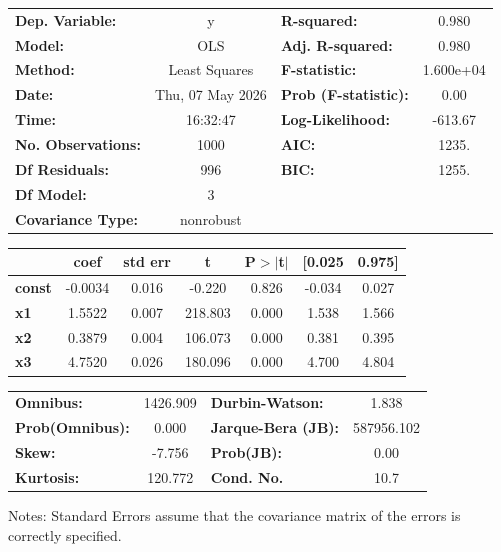 \begin{center}
\begin{tabular}{lclc}
\toprule
\textbf{Dep. Variable:}    &        y         & \textbf{  R-squared:         } &     0.980   \\
\textbf{Model:}            &       OLS        & \textbf{  Adj. R-squared:    } &     0.980   \\
\textbf{Method:}           &  Least Squares   & \textbf{  F-statistic:       } & 1.600e+04   \\
\textbf{Date:}             & Thu, 07 May 2026 & \textbf{  Prob (F-statistic):} &     0.00    \\
\textbf{Time:}             &     16:32:47     & \textbf{  Log-Likelihood:    } &   -613.67   \\
\textbf{No. Observations:} &        1000      & \textbf{  AIC:               } &     1235.   \\
\textbf{Df Residuals:}     &         996      & \textbf{  BIC:               } &     1255.   \\
\textbf{Df Model:}         &           3      & \textbf{                     } &             \\
\textbf{Covariance Type:}  &    nonrobust     & \textbf{                     } &             \\
\bottomrule
\end{tabular}
\begin{tabular}{lcccccc}
               & \textbf{coef} & \textbf{std err} & \textbf{t} & \textbf{P$> |$t$|$} & \textbf{[0.025} & \textbf{0.975]}  \\
\midrule
\textbf{const} &      -0.0034  &        0.016     &    -0.220  &         0.826        &       -0.034    &        0.027     \\
\textbf{x1}    &       1.5522  &        0.007     &   218.803  &         0.000        &        1.538    &        1.566     \\
\textbf{x2}    &       0.3879  &        0.004     &   106.073  &         0.000        &        0.381    &        0.395     \\
\textbf{x3}    &       4.7520  &        0.026     &   180.096  &         0.000        &        4.700    &        4.804     \\
\bottomrule
\end{tabular}
\begin{tabular}{lclc}
\textbf{Omnibus:}       & 1426.909 & \textbf{  Durbin-Watson:     } &     1.838   \\
\textbf{Prob(Omnibus):} &   0.000  & \textbf{  Jarque-Bera (JB):  } & 587956.102  \\
\textbf{Skew:}          &  -7.756  & \textbf{  Prob(JB):          } &      0.00   \\
\textbf{Kurtosis:}      & 120.772  & \textbf{  Cond. No.          } &      10.7   \\
\bottomrule
\end{tabular}
\end{center}

Notes: \newline
 [1] Standard Errors assume that the covariance matrix of the errors is correctly specified.